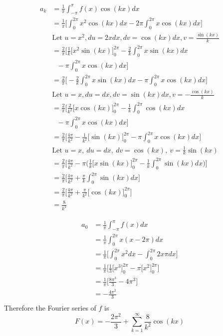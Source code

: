 \documentclass{article}
\begin{document}
\begin{enumerate}
\begin{multicols}{2}
\begin{align*}
    a_k &= \frac{1}{\pi} \int_{-\pi}^{\pi}f(x)\cos(kx) dx \\
    &= \frac{1}{\pi} \Bigg[\int_{0}^{2\pi} x^2\cos(kx) dx - 2\pi \int_{0}^{2\pi} x \cos(kx) dx \Bigg]\\
    &\text{Let $u = x^2, du = 2xdx, dv = \cos(kx) dx, v = \frac{\sin(kx)}{k}$} \\
    &= \frac{2}{\pi} \Bigg[\frac{1}{k}\Big[x^2\sin(kx)\Big]_{0}^{2\pi}  - \frac{2}{k}\int_{0}^{2\pi}x\sin(kx)dx  \\
    & \: \: \: - \pi\int_{0}^{2\pi} x \cos(kx) dx \Bigg]\\
    &= \frac{2}{\pi} \Bigg[- \frac{2}{k}\int_{0}^{2\pi}x\sin(kx)dx - \pi\int_{0}^{2\pi} x \cos(kx) dx \Bigg]\\
    &\text{Let $u = x, du = dx, dv = \sin(kx) dx, v = -\frac{\cos(kx)}{k}$} \\
    &= \frac{2}{\pi} \Bigg[ \frac{2}{k^2}\Big[x\cos(kx) \Big]_{0}^{2\pi} - \frac{1}{k}\int_{0}^{2\pi}\cos(kx)dx \\
    & \: \: \: - \pi\int_{0}^{2\pi} x \cos(kx) dx \Bigg]\\
    &= \frac{2}{\pi} \Bigg[ \frac{4\pi}{k^2} - \frac{1}{k^2} \Big[ \sin(kx) \Big]_{0}^{2\pi} - \pi\int_{0}^{2\pi} x \cos(kx) dx \Bigg]\\
    &\text{Let } u = x,\: du = dx,\: dv = \cos(kx),\: v = \frac{1}{k}\sin(kx) \\
    &= \frac{2}{\pi} \Bigg[ \frac{4\pi}{k^2} - \pi\Big(\frac{1}{k}\Big[ x\sin(kx)\Big]_{0}^{2\pi} - \frac{1}{k}\int_{0}^{2\pi}\sin(kx)dx \Big)\Bigg]\\
    &= \frac{2}{\pi} \Bigg[ \frac{4\pi}{k^2} + \frac{\pi}{k}\int_{0}^{2\pi}\sin(kx)dx \Bigg]\\
    &= \frac{2}{\pi} \Bigg[ \frac{4\pi}{k^2} + \frac{\pi}{k^2}\Big[ \cos(kx)\Big]_{0}^{2\pi}\Bigg]\\
    &= \frac{8}{k^2}
\end{align*} 
\end{multicols}
\begin{align*}
    a_0 &= \frac{1}{\pi} \int_{-\pi}^{\pi}f(x) dx \\
    &= \frac{1}{\pi} \int_{0}^{2\pi}x(x-2\pi)dx \\
    &= \frac{1}{\pi} \Bigg[ \int_{0}^{2\pi}x^2dx -\int_{0}^{2\pi}2x\pi dx \Bigg]\\
    &= \frac{1}{\pi} \Bigg[ \frac{1}{3}\Big[x^3\Big]_{0}^{2\pi} - \pi\Big[x^2 \Big]_{0}^{2\pi}\Bigg]\\
    &= \frac{1}{\pi} \Bigg[ \frac{8\pi^3}{3} - 4\pi^3 \Bigg]\\
    &= -\frac{4\pi^2}{3} \\
\end{align*} 
Therefore the Fourier series of $f$ is 
\[F(x) = -\frac{2\pi^2}{3} + \sum_{k=1}^{\infty} \frac{8}{k^2}\cos(kx) \]


\end{enumerate}
\end{document}

